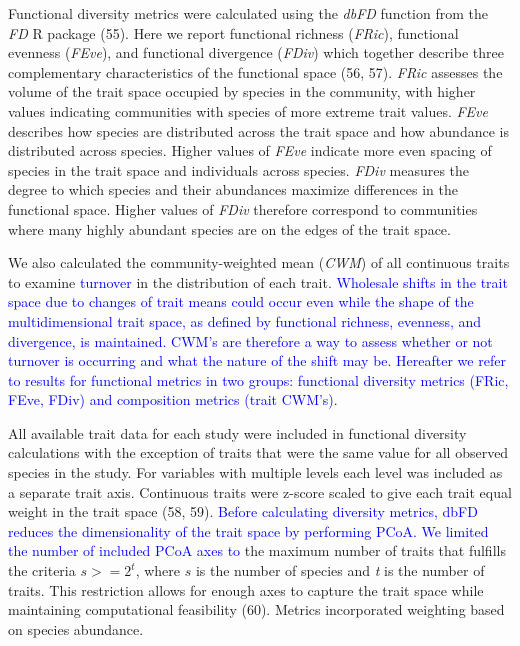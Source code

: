 \documentclass{article}
\begin{document}
Functional diversity metrics were calculated using the \emph{dbFD}
function from the \emph{FD} R package (55). Here we report functional
richness (\emph{FRic}), functional evenness (\emph{FEve}), and
functional divergence (\emph{FDiv}) which together describe three
complementary characteristics of the functional space (56, 57).
\emph{FRic} assesses the volume of the trait space occupied by species
in the community, with higher values indicating communities with species
of more extreme trait values. \emph{FEve} describes how species are
distributed across the trait space and how abundance is distributed
across species. Higher values of \emph{FEve} indicate more even spacing
of species in the trait space and individuals across species.
\emph{FDiv} measures the degree to which species and their abundances
maximize differences in the functional space. Higher values of
\emph{FDiv} therefore correspond to communities where many highly
abundant species are on the edges of the trait space.

We also calculated the community-weighted mean (\emph{CWM}) of all
continuous traits to examine \textcolor{blue}{turnover} in the
distribution of each trait.
\textcolor{blue}{Wholesale shifts in the trait space due to changes of trait means could occur even while the shape of the multidimensional trait space, as defined by functional richness, evenness, and divergence, is maintained. CWM's are therefore a way to assess whether or not turnover is occurring and what the nature of the shift may be. Hereafter we refer to results for functional metrics in two groups: functional diversity metrics (FRic, FEve, FDiv) and composition metrics (trait CWM's).}

All available trait data for each study were included in functional
diversity calculations with the exception of traits that were the same
value for all observed species in the study. For variables with multiple
levels each level was included as a separate trait axis. Continuous
traits were z-score scaled to give each trait equal weight in the trait
space (58, 59).
\textcolor{blue}{Before calculating diversity metrics, dbFD reduces the dimensionality of the trait space by performing PCoA. We limited the number of included PCoA axes to}
the maximum number of traits that fulfills the criteria \(s >= 2^t\),
where \(s\) is the number of species and \emph{t} is the number of
traits. This restriction allows for enough axes to capture the trait
space while maintaining computational feasibility (60). Metrics
incorporated weighting based on species abundance.
\end{document}
